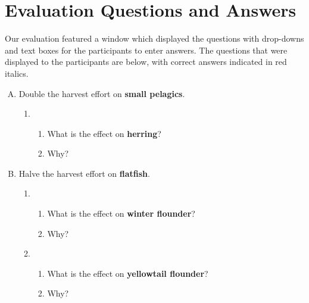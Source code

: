 \chapter{Evaluation Questions and Answers} \label{sec:questions}

Our evaluation featured a window which displayed the questions with drop-downs and text boxes for the participants to enter answers.  The questions that were displayed to the participants are below, with correct answers indicated in red italics.

\begin{enumerate}[(A)]
\item Double the harvest effort on \textbf{small pelagics}.

\begin{enumerate}[1.]
\item 
\begin{enumerate}
\item What is the effect on \textbf{herring}? 
\item Why? 
\end{enumerate}
\end{enumerate}

\item Halve the harvest effort on \textbf{flatfish}.

\begin{enumerate}[1.] \addtocounter{enumii}{1}
\item 
\begin{enumerate}
\item What is the effect on \textbf{winter flounder}? 
\item Why? 
\end{enumerate}

\item 
\begin{enumerate}
\item What is the effect on \textbf{yellowtail flounder}? 
\item Why? 
\end{enumerate}
\end{enumerate}


\end{enumerate}
